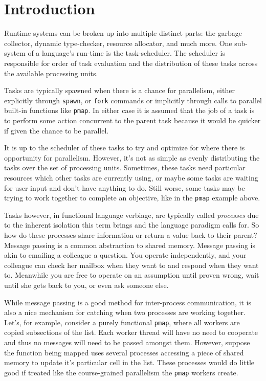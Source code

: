 \chapter{Introduction}
%
\label{chap:introduction}

Runtime systems can be broken up into multiple distinct parts: the garbage 
collector, dynamic type-checker, resource allocator, and much more. One 
sub-system of a language's run-time is the task-scheduler. The scheduler is 
responsible for order of task evaluation and the distribution of 
these tasks across the available processing units.

Tasks are typically spawned when there is a chance for parallelism, either 
explicitly through \texttt{spawn}, or \texttt{fork} commands or implicitly 
through calls to parallel built-in functions like \texttt{pmap}. In either 
case it is assumed that the job of a task is to perform some action concurrent 
to the parent task because it would be quicker if given the chance to be 
parallel.

It is up to the scheduler of these tasks to try and optimize for where there
is opportunity for parallelism. However, it's not as simple as evenly 
distributing the tasks over the set of processing units. Sometimes, these 
tasks need particular resources which other tasks are currently using,
or maybe some tasks are waiting for user input and don't have anything to
do. Still worse, some tasks may be trying to work together to complete an 
objective, like in the \texttt{pmap} example above.

Tasks however, in functional language verbiage, are typically called 
{\em processes} due to the inherent isolation this term brings and the language 
paradigm calls for. So how do these processes share information or return a 
value back to their parent? Message passing is a common abstraction to shared
memory. Message passing is akin to emailing a colleague a question. You operate
independently, and your colleague can check her mailbox when they want to and 
respond when they want to. Meanwhile you are free to operate on an assumption 
until proven wrong, wait until she gets back to you, or even ask someone else.

While message passing is a good method for inter-process communication, it is
also a nice mechanism for catching when two processes are working together.
Let's, for example, consider a purely functional \texttt{pmap}, where all 
workers are copied subsections of the list. Each worker thread will have no
need to cooperate and thus no messages will need to be passed amongst them.
However, suppose the function being mapped uses several processes accessing a 
piece of shared memory to update it's particular cell in the list. These 
processes would do little good if treated like the course-grained parallelism
the \texttt{pmap} workers create. 

